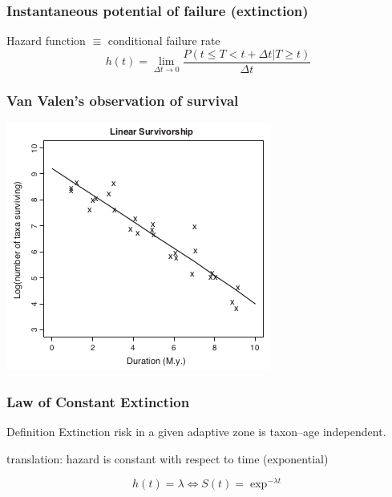 \documentclass{beamer} \usepackage{amsmath,amsthm}
\begin{document}
\begin{frame}
  \frametitle{Instantaneous potential of failure (extinction)}

  \begin{block}{Hazard function \(\equiv\) conditional failure rate}
    \[
      h(t) = \lim_{\Delta t \to 0} \frac{P(t \leq T < t + \Delta t | T \geq t)}{\Delta t}
    \]
  \end{block}

\end{frame}

\begin{frame}
  \frametitle{Van Valen's observation of survival}

  \begin{center}
    \includegraphics[height = 0.7\textheight, keepaspectratio = true]{figure/liow}

    \tiny{}
  \end{center}
\end{frame}

\begin{frame}
  \frametitle{Law of Constant Extinction}

  \begin{alertblock}{Definition}
      Extinction risk in a given adaptive zone is taxon--age independent.

      \tiny{}
  \end{alertblock}

  translation: hazard is constant with respect to time (\alert{exponential})

  \[
    h(t) = \lambda \iff S(t) = \exp^{-\lambda t}
  \]

\end{frame}
\end{document}
